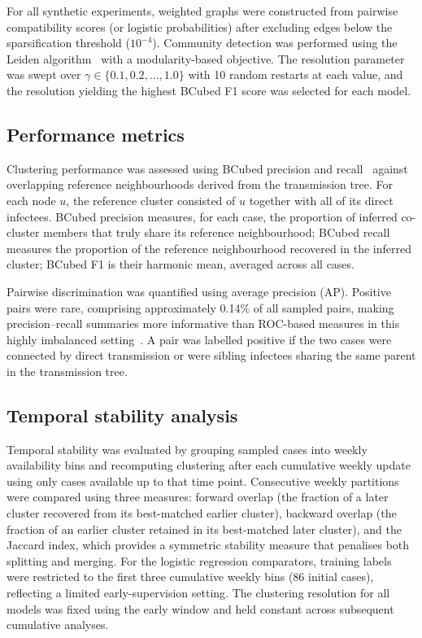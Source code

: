 \documentclass[10pt,letterpaper]{article}
\begin{document}
For all synthetic experiments, weighted graphs were constructed from pairwise compatibility scores (or logistic probabilities) after excluding edges below the sparsification threshold ($10^{-4}$). Community detection was performed using the Leiden algorithm~\cite{Traag2019} with a modularity-based objective. The resolution parameter was swept over $\gamma \in \{0.1, 0.2, \ldots, 1.0\}$ with 10 random restarts at each value, and the resolution yielding the highest BCubed F1 score was selected for each model.

\subsection*{Performance metrics}

Clustering performance was assessed using BCubed precision and recall~\cite{Amigo2008} against overlapping reference neighbourhoods derived from the transmission tree. For each node $u$, the reference cluster consisted of $u$ together with all of its direct infectees. BCubed precision measures, for each case, the proportion of inferred co-cluster members that truly share its reference neighbourhood; BCubed recall measures the proportion of the reference neighbourhood recovered in the inferred cluster; BCubed F1 is their harmonic mean, averaged across all cases.

Pairwise discrimination was quantified using average precision (AP). Positive pairs were rare, comprising approximately 0.14\% of all sampled pairs, making precision--recall summaries more informative than ROC-based measures in this highly imbalanced setting~\cite{Saito2015}. A pair was labelled positive if the two cases were connected by direct transmission or were sibling infectees sharing the same parent in the transmission tree.

\subsection*{Temporal stability analysis}

Temporal stability was evaluated by grouping sampled cases into weekly availability bins and recomputing clustering after each cumulative weekly update using only cases available up to that time point. Consecutive weekly partitions were compared using three measures: forward overlap (the fraction of a later cluster recovered
from its best-matched earlier cluster), backward overlap (the fraction of an earlier cluster retained in its best-matched later cluster), and the Jaccard index, which provides a symmetric stability measure that penalises both splitting and merging. For the logistic regression comparators, training labels were restricted
to the first three cumulative weekly bins (86 initial cases), reflecting a limited early-supervision setting. The clustering resolution for all models was fixed using the early window and held constant across subsequent cumulative analyses.
\end{document}
